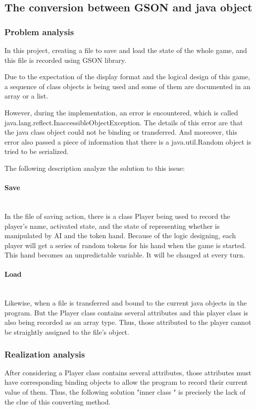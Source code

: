 \subsection{The conversion between GSON and java object}

\subsubsection{Problem analysis}
In this project, creating a file to save and load the state of the whole game, and this file is recorded using GSON library. 

Due to the expectation of the display format and the logical design of this game, a sequence of class objects is being used and some of them are documented in an array or a list. 

However, during the implementation, an error is encountered, which is called java.lang.reflect.InaccessibleObjectException. The details of this error are that the java class object could not be binding or transferred. And moreover, this error also passed a piece of information that there is a java.util.Random object is tried to be serialized. 

The following description analyze the solution to this issue:

\paragraph{Save} \mbox{}\\
In the file of saving action, there is a class Player being used to record the player's name, activated state, and the state of representing whether is manipulated by AI and the token hand. Because of the logic designing, each player will get a series of random tokens for his hand when the game is started. This hand becomes an unpredictable variable. It will be changed at every turn.  

\paragraph{Load} \mbox{}\\
Likewise, when a file is transferred and bound to the current java objects in the program. But the Player class contains several attributes and this player class is also being recorded as an array type. Thus, those attributed to the player cannot be straightly assigned to the file's object.  


\subsubsection{Realization analysis}
After considering a Player class contains several attributes, those attributes must have corresponding binding objects to allow the program to record their current value of them. Thus, the following solution "inner class " is precisely the lack of the clue of this converting method.
 

